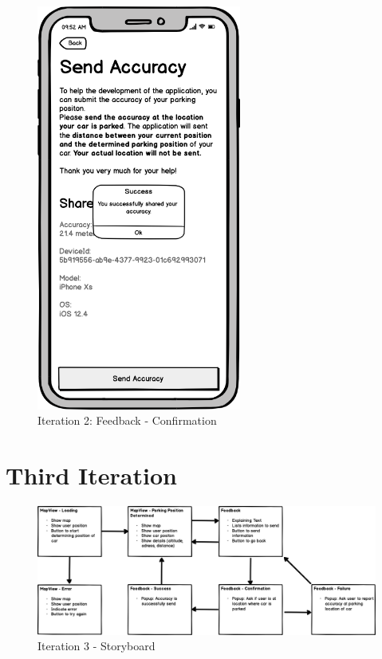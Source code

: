 \begin{figure}[H]
  \centering
  \begin{minipage}[b]{0.45\textwidth}
    \centering
    \includegraphics[width=0.6\textwidth]{images/UI/Iteration2-Feedback-Confirmation.png}
    \caption{Iteration 2: Feedback - Confirmation}
    \label{fig:i2-feedback-con}
  \end{minipage}
  \hfill
  \begin{minipage}[b]{0.45\textwidth}
    
  \end{minipage}
\end{figure}

\section{Third Iteration}

\begin{figure}[H]
    \centering
    \includegraphics[width=\textwidth]{images/UI/Iteration3-Overview.png}
    \caption{Iteration 3 - Storyboard}
    \label{fig:i3story}
\end{figure}

